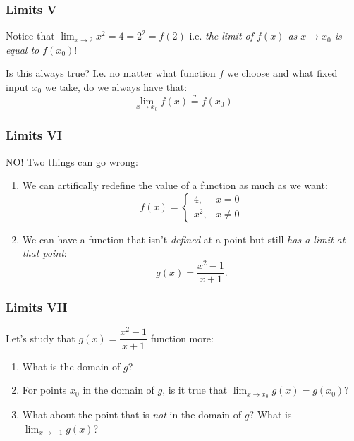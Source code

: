 \documentclass{ltx-talk}
\begin{document}
\begin{frame}
  \frametitle{Limits V}

  Notice that $\lim_{x \rightarrow 2} x^2 = 4 = 2^2 = f(2)$ \pause
  i.e. \textit{the limit of $f(x)$ as $x \rightarrow x_0$ is equal to $f(x_0)$}! \pause

  Is this always true? \pause I.e. no matter what function $f$ we choose and what fixed input $x_0$ we take, \pause
  do we always have that: 
  \begin{equation}
    \lim_{x \rightarrow x_0} f(x) \stackrel{?}{=} f(x_0)
  \end{equation} \pause
\end{frame}
\begin{frame}
  \frametitle{Limits VI}
  \begin{alertblock}{NO!}
    Two things can go wrong: \pause
    \begin{enumerate}
      \item We can artifically redefine the value of a function as much as we want: \pause
        \begin{equation}
          f(x) = \begin{cases} 4, & x = 0 \\ x^2, & x \neq 0 \end{cases}
        \end{equation} \pause
      \item We can have a function that isn't \textit{defined} at a point but still \textit{has a limit at that point}: \pause
        \begin{equation}
          g(x) = \dfrac{x^2 - 1}{x + 1}.
        \end{equation}
    \end{enumerate}
  \end{alertblock}
\end{frame}
\begin{frame}
  \frametitle{Limits VII}
  Let's study that $g(x) = \dfrac{x^2 - 1}{x + 1}$ function more: \pause

  \begin{enumerate}
    \item What is the domain of $g$? \pause
    \item For points $x_0$ in the domain of $g$, is it true that $\lim_{x \rightarrow x_0} g(x) = g(x_0)$? \pause
    \item What about the point that is \textit{not} in the domain of $g$? What is $\lim_{x \rightarrow -1} g(x)$?
  \end{enumerate}

\end{frame}
\end{document}
